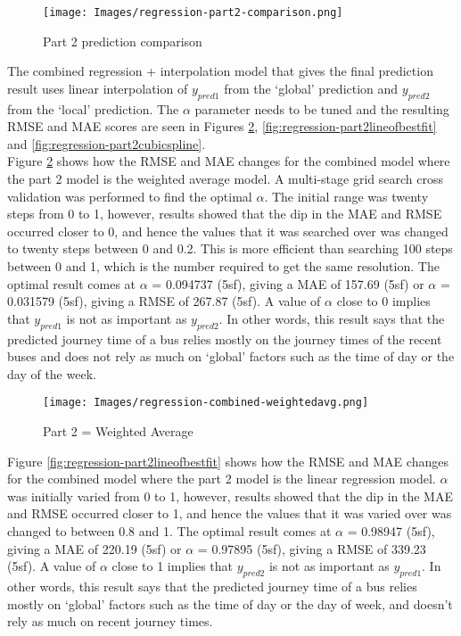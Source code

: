 \begin{figure}[H]
\begin{center}
    \texttt{[image: Images/regression-part2-comparison.png]}
    \caption{Part 2 prediction comparison}
    \label{fig:part2-comparison}
\end{center}
\end{figure}

The combined regression + interpolation model that gives the final prediction result uses linear interpolation of $y_{pred1}$ from the `global' prediction and $y_{pred2}$ from the `local' prediction. The $\alpha$ parameter needs to be tuned and the resulting RMSE and MAE scores are seen in Figures \ref{fig:regression-part2weightedavg}, \ref{fig:regression-part2lineofbestfit} and \ref{fig:regression-part2cubicspline}. \\

Figure \ref{fig:regression-part2weightedavg} shows how the RMSE and MAE changes for the combined model where the part 2 model is the weighted average model. A multi-stage grid search cross validation was performed to find the optimal $\alpha$. The initial range was twenty steps from 0 to 1, however, results showed that the dip in the MAE and RMSE occurred closer to 0, and hence the values that it was searched over was changed to twenty steps between 0 and 0.2. This is more efficient than searching 100 steps between 0 and 1, which is the number required to get the same resolution. The optimal result comes at $\alpha$ = 0.094737 (5sf), giving a MAE of 157.69 (5sf) or $\alpha$ = 0.031579 (5sf), giving a RMSE of 267.87 (5sf). A value of $\alpha$ close to 0 implies that $y_{pred1}$ is not as important as $y_{pred2}$. In other words, this result says that the predicted journey time of a bus relies mostly on the journey times of the recent buses and does not rely as much on `global' factors such as the time of day or the day of the week.

\begin{figure}[H]
\begin{center}
    \texttt{[image: Images/regression-combined-weightedavg.png]}
    \caption{Part 2 = Weighted Average}
    \label{fig:regression-part2weightedavg}
\end{center}
\end{figure}

Figure \ref{fig:regression-part2lineofbestfit} shows how the RMSE and MAE changes for the combined model where the part 2 model is the linear regression model. $\alpha$ was initially varied from 0 to 1, however, results showed that the dip in the MAE and RMSE occurred closer to 1, and hence the values that it was varied over was changed to between 0.8 and 1. The optimal result comes at $\alpha$ = 0.98947 (5sf), giving a MAE of 220.19 (5sf) or $\alpha$ = 0.97895 (5sf), giving a RMSE of 339.23 (5sf). A value of $\alpha$ close to 1 implies that $y_{pred2}$ is not as important as $y_{pred1}$. In other words, this result says that the predicted journey time of a bus relies mostly on `global' factors such as the time of day or the day of week, and doesn't rely as much on recent journey times.

